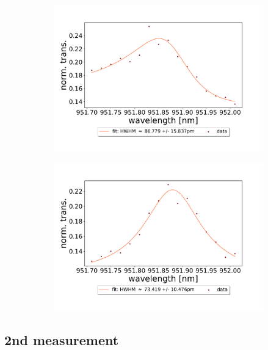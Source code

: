\begin{figure}[h!]
\begin{subfigure}[b]{0.49\textwidth}
        \caption{}
        \label{fig:30um_M3:M5_fit_2}
    \end{subfigure}
    \begin{subfigure}[b]{0.49\textwidth}
        \includegraphics[width=\textwidth]{figures/results/double fano fits/30um_M3:M5_fit_3.pdf}
        \caption{}
        \label{fig:30um_M3:M5_fit_3}
    \end{subfigure}
    \begin{subfigure}[b]{0.49\textwidth}
        \includegraphics[width=\textwidth]{figures/results/double fano fits/30um_M3:M5_fit_4.pdf}
        \caption{}
        \label{fig:30um_M3:M5_fit_4}
    \end{subfigure}
\end{figure}

\clearpage
\subsection*{2nd measurement}


